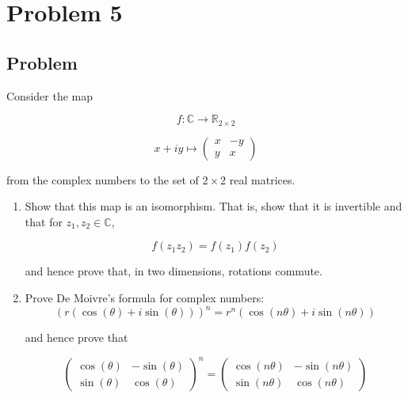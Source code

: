 \documentclass[12pt]{article}
\begin{document}
\section{Problem 5}

\subsection{Problem}

Consider the map

\begin{equation}
    f: \mathbb{C} \rightarrow \mathbb{R}_{2 \times 2}
\end{equation}

\[
    x + iy \mapsto
    \begin{pmatrix}
        x & -y \\
        y & x
    \end{pmatrix}
\]

from the complex numbers to the set of $2 \times 2$ real matrices.

\renewcommand{\labelenumi}{(\alph{enumi})}
\begin{enumerate}
    \item Show that this map is an isomorphism. That is, show that it is invertible and that for $z_{1}, z_{2} \in \mathbb{C}$,

          \begin{equation}
              f\left(z_{1} z_{2}\right)=f\left(z_{1}\right) f\left(z_{2}\right)
          \end{equation}

          and hence prove that, in two dimensions, rotations commute.
    \item Prove De Moivre's formula for complex numbers:
          \begin{equation}
              {(r(\cos (\theta)+i \sin (\theta)))}^{n}=r^{n}(\cos (n \theta)+i \sin (n \theta))
          \end{equation}

          and hence prove that

          \begin{equation}
              {\left(\begin{array}{cc}
                          \cos (\theta) & -\sin (\theta) \\
                          \sin (\theta) & \cos (\theta)
                      \end{array}\right)}^{n}=\left(\begin{array}{cc}
                      \cos (n \theta) & -\sin (n \theta) \\
                      \sin (n \theta) & \cos (n \theta)
                  \end{array}\right)
          \end{equation}
\end{enumerate}
\end{document}
